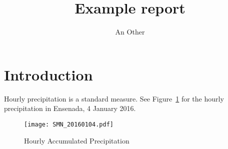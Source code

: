 \documentclass[paper=letter, fontsize=11pt]{article}
\title{Example report}
\author{An Other}
\date{}
\begin{document}
\maketitle
\section{Introduction}
Hourly precipitation is a standard measure. See Figure~\ref{fig:precip} for the hourly precipitation in Ensenada, 4 January 2016.
\begin{figure}
\centering
\texttt{[image: SMN\_20160104.pdf]}
\caption{Hourly Accumulated Precipitation\label{fig:precip}}
\end{figure}
\end{document}
